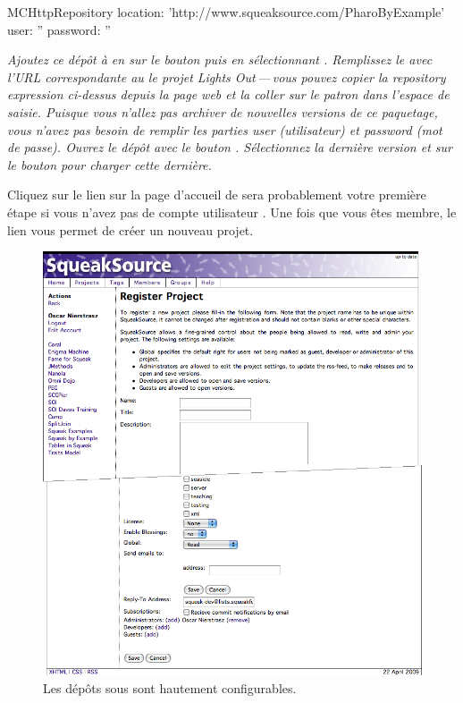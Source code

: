 \documentclass[a4paper,10pt,twoside]{book}
\begin{document}
\begin{code}{}
MCHttpRepository
    location: 'http://www.squeaksource.com/PharoByExample'
    user: ''
    password: ''
\end{code}
\noindent
\emph{Ajoutez ce dépôt à \MC en \clickant{} sur le bouton
   puis en sélectionnant . 
Remplissez le 
avec l'URL correspondante au le projet Lights Out\,---\,vous
pouvez copier la \emph{repository expression} ci-dessus depuis la
page web et la coller sur le patron dans l'espace de saisie.
Puisque vous n'allez pas archiver de nouvelles versions de ce
paquetage, vous n'avez pas besoin de remplir les parties \emph{user}
(utilisateur) et \emph{password} (mot de passe).
Ouvrez le dépôt avec le bouton
. Sélectionnez la dernière version et \clickz{} sur le
bouton  pour charger cette dernière.}

Cliquez %
sur le lien  sur la page d'accueil 
de \sqsrc sera probablement votre première étape si vous n'avez pas de
compte utilisateur  \sqsrc.
Une fois que vous êtes membre, le lien
 vous permet de créer un nouveau projet.

\begin{figure}[ht]\centering
	\includegraphics[width=\textwidth]{squeaksourcesetting}
	\caption{Les dépôts sous \sqsrc sont hautement configurables.}
\end{figure}
\end{document}
